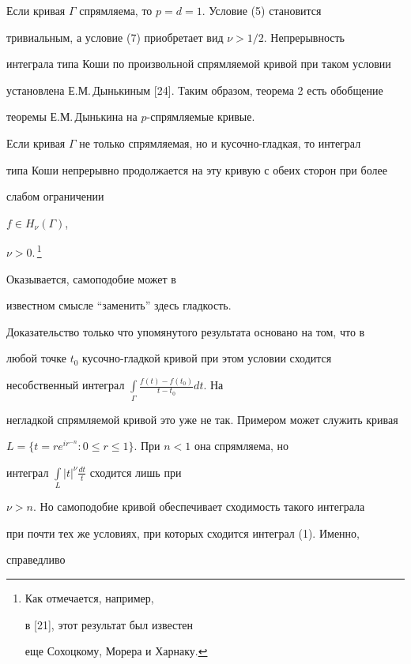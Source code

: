 Если кривая $\Gamma$ спрямляема, то $p=d=1$. Условие (5) становится


тривиальным, а условие (7) приобретает вид $\nu > 1/2$. Непрерывность


интеграла типа Коши по произвольной спрямляемой кривой при таком условии


установлена Е.М.\,Дынькиным [24]. Таким образом, теорема 2 есть обобщение


теоремы Е.М.\,Дынькина на $p$-спрямляемые кривые.





Если кривая $\Gamma$ не только спрямляемая, но и кусочно-гладкая, то интеграл


типа Коши непрерывно продолжается на эту кривую с обеих сторон при более


слабом ограничении


$f\in H_{\nu}(\Gamma)$,


$\nu>0.$\,\footnote{Как отмечается, например,


в [21], этот результат был известен


еще Сохоцкому, Морера и Харнаку.}


Оказывается, самоподобие может в


известном смысле ``заменить'' здесь гладкость.


Доказательство только что упомянутого результата основано на том, что в


любой точке $t_0$ кусочно-гладкой кривой при этом условии сходится


несобственный интеграл $\int\limits_{\Gamma}\frac{f(t)-f(t_0)}{t-t_0}dt$. На


негладкой спрямляемой кривой это уже не так. Примером может служить кривая


$L =\{t = re^{ir^{-n}}:0\le r\le 1\}$. При $n<1$ она спрямляема, но


интеграл $\int\limits_{L}|t|^{\nu}\frac{dt}{t}$ сходится лишь при


$\nu >n$. Но самоподобие кривой обеспечивает сходимость такого интеграла


при почти тех же условиях, при которых сходится интеграл (1). Именно,


справедливо





